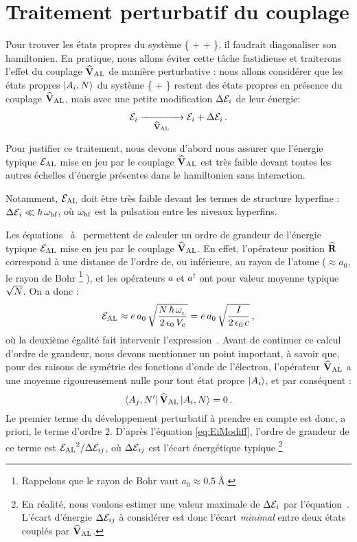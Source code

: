 \section{Traitement perturbatif du couplage}
Pour trouver les états propres du système \{ +  + \}, il faudrait diagonaliser son hamiltonien. En pratique, nous allons éviter cette tâche fastidieuse et traiterons l'effet du couplage $\VAL$ de manière perturbative : nous allons considérer que les états propres $\Ket{\AiN}$ du système \{ + \} restent des états propres en présence du couplage $\VAL$, mais avec une petite modification $\Delta \Ener_i$ de leur énergie:
\[
\Ener_i \xrightarrow[\VAL]{\phantom{aaaaaaaaa}} \Ener_i + \Delta\Ener_i
\pointformule
\]
\Remarque%
{
Pour justifier ce traitement, nous devons d'abord nous assurer que l'énergie typique $\EAL$ mise en jeu par le couplage $\VAL$ est très faible devant toutes les autres échelles d'énergie présentes dans le hamiltonien sans interaction. 

Notamment, $\EAL$ doit être très faible devant les termes de structure hyperfine : 
$\Delta \Ener_i \ll \hbar\,\omegaHF$, 
où $\omegaHF$ est la pulsation entre les niveaux hyperfins. 
}
Les équations~ à~ permettent de calculer un ordre de grandeur de l'énergie typique $\EAL$ mise en jeu par le couplage $\VAL$. En effet, l'opérateur position $\OperR$ correspond à une distance de l'ordre de, ou inférieure, au rayon de l'atome ($\approx a_0$, le rayon de Bohr%
\footnote{Rappelons que le rayon de Bohr vaut $a_0\approx \SI{0.5}{\angstrom}$.}%
), et les opérateurs $a$ et $a^\dag$ ont pour valeur moyenne typique $\sqrt{\Nph}$. On a donc :
\[
\EAL \approx e\,a_0\,\sqrt{\frac{\Nph\,\hbar\,\pulsLaser}{2\,\epsilon_0\,\Vcav}}
 = e\,a_0\,\sqrt{\frac{I}{2\,\epsilon_0\,c}}
\virguleformule
\]
où la deuxième égalité fait intervenir l'expression~. Avant de continuer ce calcul d'ordre de grandeur, nous devons mentionner un point important, à savoir que, pour des raisons de symétrie des fonctions d'onde de l'électron, l'opérateur $\VAL$ a une moyenne rigoureusement nulle pour tout état propre $\Ket{A_i}$, et par conséquent : 
\[
\BraOpKet{\AjN}{\VAL}{\AiN} = 0
\pointformule
\]
Le premier terme du développement perturbatif à prendre en compte est donc, a priori, le terme d'ordre $2$. D'après l'équation \vref{eq:EiModiff}, l'ordre de grandeur de ce terme est $\ttfrac{\EAL^2}{\EcartMini}$, où $\EcartMini$ est l'écart énergétique typique%
\footnote{En réalité, nous voulons estimer une valeur maximale de $\Delta\Ener_i$ par l'équation~. L'écart d'énergie $\EcartMini$ à considérer est donc l'écart \emph{minimal} entre deux états couplés par $\VAL$.}
